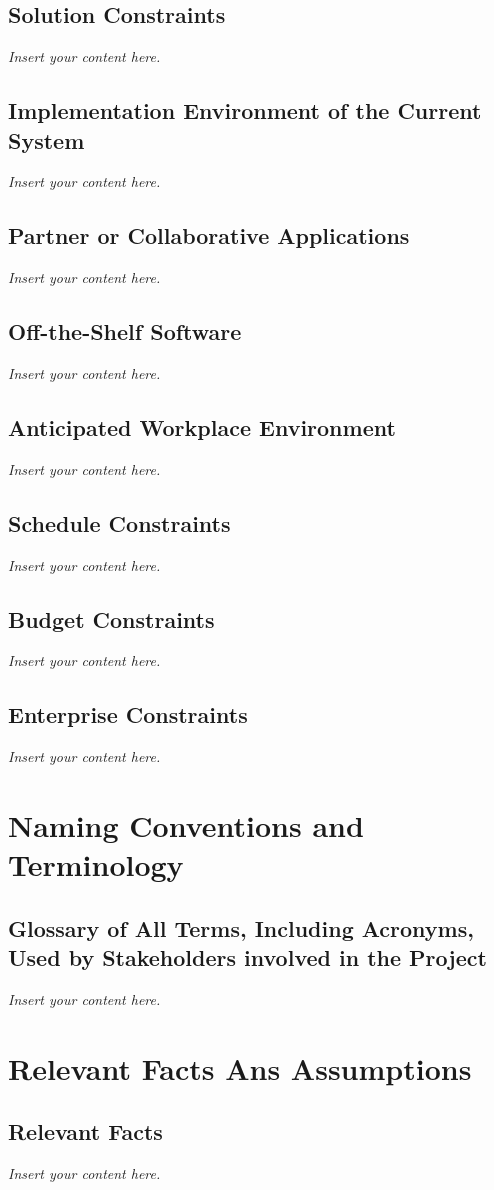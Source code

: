 \documentclass[a4paper, 12pt,twoside]{article}
\newcommand{\lips}{\textit{Insert your content here.}}
\begin{document}
\subsection{Solution Constraints}
\lips
\subsection{Implementation Environment of the Current System}
\lips
\subsection{Partner or Collaborative Applications}
\lips
\subsection{Off-the-Shelf Software}
\lips
\subsection{Anticipated Workplace Environment}
\lips
\subsection{Schedule Constraints}
\lips
\subsection{Budget Constraints}
\lips
\subsection{Enterprise Constraints}
\lips

\section{Naming Conventions and Terminology}
\subsection{Glossary of All Terms, Including Acronyms, Used by Stakeholders involved in the Project}
\lips

\section{Relevant Facts Ans Assumptions}
\subsection{Relevant Facts}
\lips
\end{document}
